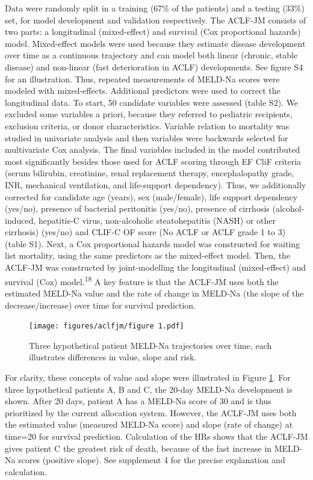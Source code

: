\documentclass[11pt,english,]{book} %
\begin{document}
Data were randomly split in a training (67\% of the patients) and a testing (33\%) set, for model development and validation respectively. The ACLF-JM consists of two parts: a longitudinal (mixed-effect) and survival (Cox proportional hazards) model. Mixed-effect models were used because they estimate disease development over time as a continuous trajectory and can model both linear (chronic, stable disease) and non-linear (fast deterioration in ACLF) developments. See figure S4 for an illustration. Thus, repeated measurements of MELD-Na scores were modeled with mixed-effects. Additional predictors were used to correct the longitudinal data. To start, 50 candidate variables were assessed (table S2). We excluded some variables a priori, because they referred to pediatric recipients, exclusion criteria, or donor characteristics. Variable relation to mortality was studied in univariate analysis and then variables were backwards selected for multivariate Cox analysis. The final variables included in the model contributed most significantly besides those used for ACLF scoring through EF CliF criteria (serum bilirubin, creatinine, renal replacement therapy, encephalopathy grade, INR, mechanical ventilation, and life-support dependency). Thus, we additionally corrected for candidate age (years), sex (male/female), life support dependency (yes/no), presence of bacterial peritonitis (yes/no), presence of cirrhosis (alcohol-induced, hepatitis-C virus, non-alcoholic steatohepatitis (NASH) or other cirrhosis) (yes/no) and CLIF-C OF score (No ACLF or ACLF grade 1 to 3) (table S1). Next, a Cox proportional hazards model was constructed for waiting list mortality, using the same predictors as the mixed-effect model. Then, the ACLF-JM was constructed by joint-modelling the longitudinal (mixed-effect) and survival (Cox) model.\textsuperscript{18} A key feature is that the ACLF-JM uses both the estimated MELD-Na value and the rate of change in MELD-Na (the slope of the decrease/increase) over time for survival prediction.

\begin{figure}
\centering
\texttt{[image: figures/aclfjm/figure 1.pdf]}
\caption{\label{fig:aclf-fig1}Three hypothetical patient MELD-Na trajectories over time, each illustrates differences in value, slope and risk.}
\end{figure}

For clarity, these concepts of value and slope were illustrated in Figure \ref{fig:aclf-fig1}. For three hypothetical patients A, B and C, the 20-day MELD-Na development is shown. After 20 days, patient A has a MELD-Na score of 30 and is thus prioritized by the current allocation system. However, the ACLF-JM uses both the estimated value (measured MELD-Na score) and slope (rate of change) at time=20 for survival prediction. Calculation of the HRs shows that the ACLF-JM gives patient C the greatest risk of death, because of the fast increase in MELD-Na scores (positive slope). See supplement 4 for the precise explanation and calculation.
\end{document}
